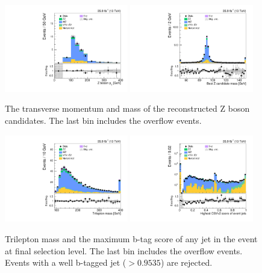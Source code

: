 \clearpage
\begin{figure}[!t]
\centering
\includegraphics[width=0.48\textwidth]{figures/dibosons/wz3l/pTZ.pdf}
\includegraphics[width=0.48\textwidth]{figures/dibosons/wz3l/minMassZ_Nminus1.pdf}
\caption{The transverse momentum and mass of the reconstructed Z boson candidates.
The last bin includes the overflow events.
\label{fig:wz3l_z}}
\end{figure}

\begin{figure}[!hb]
\centering
\includegraphics[width=0.48\textwidth]{figures/dibosons/wz3l/m3l_Nminus1.pdf}
\includegraphics[width=0.48\textwidth]{figures/dibosons/wz3l/bDiscrMax_Nminus1.pdf}
\caption{Trilepton mass and the maximum b-tag score of any jet in the event
at final selection level.
The last bin includes the overflow events. Events with a well b-tagged jet ($>0.9535$) are rejected.
\label{fig:wz3l_purity}}
\end{figure}

